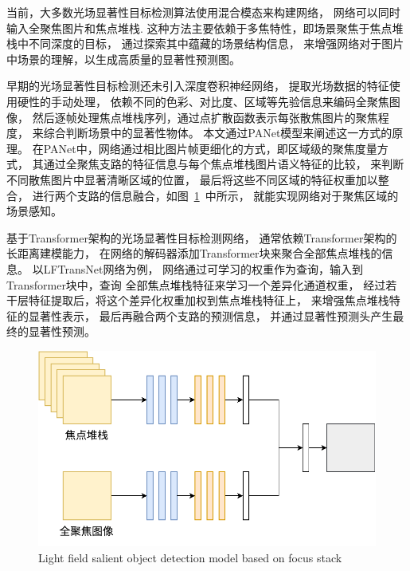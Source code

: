   
当前，大多数光场显著性目标检测算法使用混合模态来构建网络，
网络可以同时输入全聚焦图片和焦点堆栈.
这种方法主要依赖于多焦特性，即场景聚焦于焦点堆栈中不同深度的目标，
通过探索其中蕴藏的场景结构信息，
来增强网络对于图片中场景的理解，以生成高质量的显著性预测图。





早期的光场显著性目标检测还未引入深度卷积神经网络，
提取光场数据的特征使用硬性的手动处理，
依赖不同的色彩、对比度、区域等先验信息来编码全聚焦图像，
然后逐帧处理焦点堆栈序列，通过点扩散函数表示每张散焦图片的聚焦程度，
来综合判断场景中的显著性物体。
本文通过PANet模型来阐述这一方式的原理。
在PANet中，网络通过相比图片帧更细化的方式，即区域级的聚焦度量方式，
其通过全聚焦支路的特征信息与每个焦点堆栈图片语义特征的比较，
来判断不同散焦图片中显著清晰区域的位置，
最后将这些不同区域的特征权重加以整合，
进行两个支路的信息融合，如图~\ref{cpt2_fig9:model_of_fs_inputs}~中所示，
就能实现网络对于聚焦区域的场景感知。






基于Transformer架构的光场显著性目标检测网络，
通常依赖Transformer架构的长距离建模能力，
在网络的解码器添加Transformer块来聚合全部焦点堆栈的信息。
以LFTransNet网络为例，
网络通过可学习的权重作为查询，输入到Transformer块中，查询
全部焦点堆栈特征来学习一个差异化通道权重，
经过若干层特征提取后，将这个差异化权重加权到焦点堆栈特征上，
来增强焦点堆栈特征的显著性表示，
最后再融合两个支路的预测信息，
并通过显著性预测头产生最终的显著性预测。








\begin{figure}[t]
	\centering
	\includegraphics[width=0.70\linewidth]{figures/chapter2/model_of_fs_inputs}
	{Light field salient object detection model based on focus stack}  
	\label{cpt2_fig9:model_of_fs_inputs}
\end{figure}



